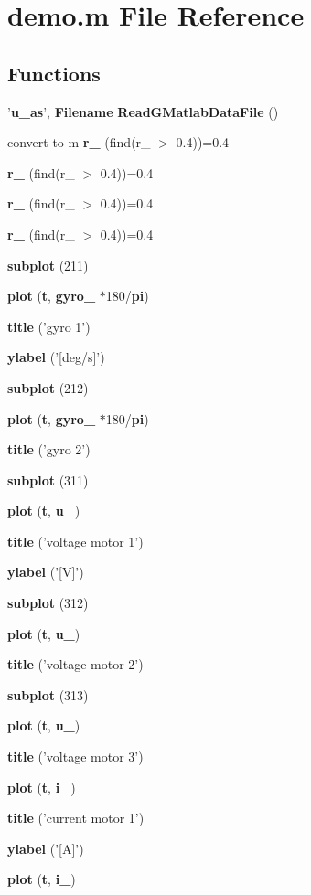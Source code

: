 \section{demo.m File Reference}
\label{matlabdatafiles_2control__mode_2demo_8m}
\subsection*{Functions}
\begin{DoxyCompactItemize}
\item 
'{\bf u\_\-as}', {\bf Filename} {\bf ReadGMatlabDataFile} ()
\item 
convert to m {\bf r\_} (find(r\_ $>$ 0.4))=0.4
\item 
{\bf r\_} (find(r\_ $>$ 0.4))=0.4
\item 
{\bf r\_} (find(r\_ $>$ 0.4))=0.4
\item 
{\bf r\_} (find(r\_ $>$ 0.4))=0.4
\item 
{\bf subplot} (211)
\item 
{\bf plot} ({\bf t}, {\bf gyro\_} $\ast$180/{\bf pi})
\item 
{\bf title} ('gyro 1')
\item 
{\bf ylabel} ('[deg/s]')
\item 
{\bf subplot} (212)
\item 
{\bf plot} ({\bf t}, {\bf gyro\_} $\ast$180/{\bf pi})
\item 
{\bf title} ('gyro 2')
\item 
{\bf subplot} (311)
\item 
{\bf plot} ({\bf t}, {\bf u\_})
\item 
{\bf title} ('voltage motor 1')
\item 
{\bf ylabel} ('[V]')
\item 
{\bf subplot} (312)
\item 
{\bf plot} ({\bf t}, {\bf u\_})
\item 
{\bf title} ('voltage motor 2')
\item 
{\bf subplot} (313)
\item 
{\bf plot} ({\bf t}, {\bf u\_})
\item 
{\bf title} ('voltage motor 3')
\item 
{\bf plot} ({\bf t}, {\bf i\_})
\item 
{\bf title} ('current motor 1')
\item 
{\bf ylabel} ('[A]')
\item 
{\bf plot} ({\bf t}, {\bf i\_})

\end{DoxyCompactItemize}
